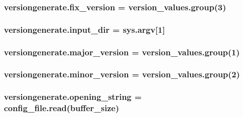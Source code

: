 \subsubsection[{\texorpdfstring{fix\+\_\+version}{fix_version}}]{\setlength{\rightskip}{0pt plus 5cm}versiongenerate.\+fix\+\_\+version = version\+\_\+values.\+group(3)}\hypertarget{namespaceversiongenerate_aa92fb32c5f03f516f3b6224c620b66e4}{}\label{namespaceversiongenerate_aa92fb32c5f03f516f3b6224c620b66e4}
\subsubsection[{\texorpdfstring{input\+\_\+dir}{input_dir}}]{\setlength{\rightskip}{0pt plus 5cm}versiongenerate.\+input\+\_\+dir = sys.\+argv\mbox{[}1\mbox{]}}\hypertarget{namespaceversiongenerate_a68af424183a162a61507cdc378cf255e}{}\label{namespaceversiongenerate_a68af424183a162a61507cdc378cf255e}
\subsubsection[{\texorpdfstring{major\+\_\+version}{major_version}}]{\setlength{\rightskip}{0pt plus 5cm}versiongenerate.\+major\+\_\+version = version\+\_\+values.\+group(1)}\hypertarget{namespaceversiongenerate_a4b536109523f1bc805806f8d76ca34ac}{}\label{namespaceversiongenerate_a4b536109523f1bc805806f8d76ca34ac}
\subsubsection[{\texorpdfstring{minor\+\_\+version}{minor_version}}]{\setlength{\rightskip}{0pt plus 5cm}versiongenerate.\+minor\+\_\+version = version\+\_\+values.\+group(2)}\hypertarget{namespaceversiongenerate_af8027cbccfcda6a243f0544cc3c08b28}{}\label{namespaceversiongenerate_af8027cbccfcda6a243f0544cc3c08b28}
\subsubsection[{\texorpdfstring{opening\+\_\+string}{opening_string}}]{\setlength{\rightskip}{0pt plus 5cm}versiongenerate.\+opening\+\_\+string = config\+\_\+file.\+read({\bf buffer\+\_\+size})}\hypertarget{namespaceversiongenerate_a88cc36d80d757546e04817490ebb0640}{}\label{namespaceversiongenerate_a88cc36d80d757546e04817490ebb0640}

